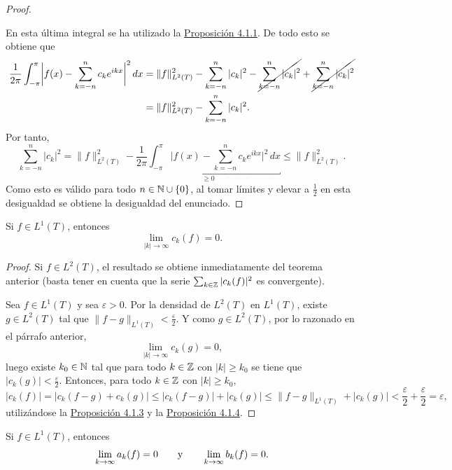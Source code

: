 \documentclass[a4paper, 11pt, oneside]{report}
\begin{document}
\begin{proof}
\begin{itemize}
  \end{itemize}
  En esta última integral se ha utilizado la \hyperref[pro:4.1.1]{\color{c1}Proposición 4.1.1}. De todo esto se obtiene que
  \[
  \begin{aligned}[t]
    \frac{1}{2\pi}\int_{-\pi}^\pi \biggl|f(x)-\sum_{k=-n}^n c_ke^{ikx}\biggr|^2 \, dx &= \|f\|_{L^2(T)}^2 - \sum_{k=-n}^n |c_k|^2- \cancel{\sum_{k=-n}^n |c_k|^2}+\cancel{\sum_{k=-n}^n |c_k|^2} \\
    &= \|f\|_{L^2(T)}^2 - \sum_{k=-n}^n |c_k|^2.
  \end{aligned}
  \]
  Por tanto,
  \[\sum_{k=-n}^n |c_k|^2 = \|f\|_{L^2(T)}^2 - \underbracket{\frac{1}{2\pi}\int_{-\pi}^\pi \biggl|f(x)-\sum_{k=-n}^n c_ke^{ikx}\biggr|^2 \, dx }_{\geq 0}\leq \|f\|_{L^2(T)}^2.\]
  Como esto es válido para todo $n \in \mathbb N  \cup \{0\}$, al tomar límites y elevar a $\frac{1}{2}$ en esta desigualdad se obtiene la desigualdad del enunciado.
\end{proof}

\begin{theorem}
  Si $f \in L^1(T)$, entonces
  \[\lim_{|k| \to \infty} c_k(f) = 0.\]
\end{theorem}

\begin{proof}
  Si $f \in L^2(T)$, el resultado se obtiene inmediatamente del teorema anterior (basta tener en cuenta que la serie $\sum_{k \in \mathbb Z} |c_k(f)|^2$ es convergente).

  Sea $f \in L^1(T)$ y sea $\varepsilon > 0$. Por la densidad de $L^2(T)$ en $L^1(T)$, existe $g \in L^2(T)$ tal que $\|f-g\|_{L^1(T)} < \frac{\varepsilon}{2}$. Y como $g \in L^2(T)$, por lo razonado en el párrafo anterior,
  \[\lim_{|k|\to \infty} c_k(g) = 0,\]
  luego existe $k_0\in \mathbb N$ tal que para todo $k \in \mathbb Z$ con $|k| \geq k_0$ se tiene que $|c_k(g)| < \frac{\varepsilon}{2}$. Entonces, para todo $k \in \mathbb Z$ con $|k| \geq k_0$,
  \[|c_k(f)| = |c_k(f-g)+c_k(g)| \leq |c_k(f-g)|+|c_k(g)| \leq \|f-g\|_{L^1(T)}+|c_k(g)| < \frac{\varepsilon}{2}+\frac{\varepsilon}{2} = \varepsilon,\]
  utilizándose la \hyperref[pro:4.1.3]{\color{c1}Proposición 4.1.3} y la \hyperref[pro:4.1.4]{\color{c1}Proposición 4.1.4}.
\end{proof}

\begin{corollary}\label{cor:4.1.9}
  Si $f \in L^1(T)$, entonces
  \[\lim_{k \to \infty} a_k(f) =0 \qquad \textup{y} \qquad \lim_{k \to \infty} b_k(f) = 0.\]
\end{corollary}
\end{document}
